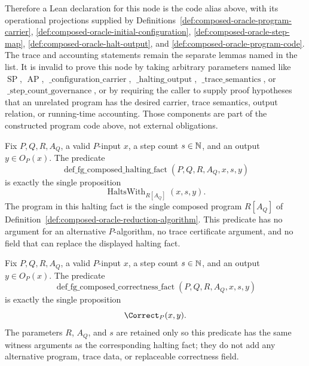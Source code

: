 \begin{definition}
  Therefore a Lean declaration for this node is the code alias above, with its
  operational projections supplied by
  Definitions~\ref{def:composed-oracle-program-carrier},
  \ref{def:composed-oracle-initial-configuration},
  \ref{def:composed-oracle-step-map},
  \ref{def:composed-oracle-halt-output}, and
  \ref{def:composed-oracle-program-code}.  The trace and accounting statements
  remain the separate lemmas named in the \uses list.  It is invalid to prove
  this node by taking arbitrary parameters named like
  $\operatorname{SP}$, $\operatorname{AP}$,
  $\operatorname{\_configuration\_carrier}$,
  $\operatorname{\_halting\_output}$,
  $\operatorname{\_trace\_semantics}$, or
  $\operatorname{\_step\_count\_governance}$, or by requiring the caller to
  supply proof hypotheses that an unrelated program has the desired carrier,
  trace semantics, output relation, or running-time accounting.  Those
  components are part of the constructed program code above, not external
  obligations.
\end{definition}

\begin{definition}
  \label{def:fg-composed-halting-fact}
  Fix $P,Q,R,A_Q$, a valid $P$-input $x$, a step count $s\in\mathbb{N}$, and an output
  $y\in O_P(x)$.  The predicate
  \[
    \operatorname{def\_fg\_composed\_halting\_fact}(P,Q,R,A_Q,x,s,y)
  \]
  is exactly the single proposition
  \[
    \operatorname{HaltsWith}_{R[A_Q]}(x,s,y).
  \]
  The program in this halting fact is the single composed program $R[A_Q]$ of
  Definition~\ref{def:composed-oracle-reduction-algorithm}.  This predicate
  has no argument for an alternative $P$-algorithm, no trace certificate
  argument, and no field that can replace the displayed halting fact.
\end{definition}

\begin{definition}
  \label{def:fg-composed-correctness-fact}
  Fix $P,Q,R,A_Q$, a valid $P$-input $x$, a step count $s\in\mathbb{N}$, and an output
  $y\in O_P(x)$.  The predicate
  \[
    \operatorname{def\_fg\_composed\_correctness\_fact}(P,Q,R,A_Q,x,s,y)
  \]
  is exactly the single proposition
  \[
    \Correct_P(x,y).
  \]
  The parameters $R$, $A_Q$, and $s$ are retained only so this predicate has
  the same witness arguments as the corresponding halting fact; they do not
  add any alternative program, trace data, or replaceable correctness field.
\end{definition}

